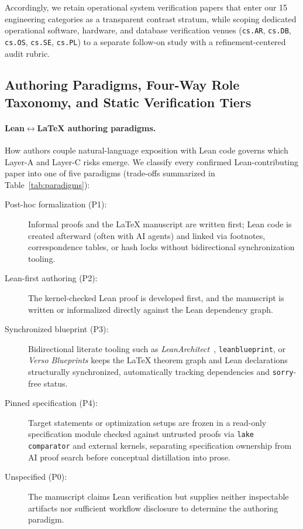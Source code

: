 \documentclass[11pt,letterpaper]{article}
\begin{document}
Accordingly, we retain operational system verification papers that enter our 15 engineering categories as a transparent contrast stratum, while scoping dedicated operational software, hardware, and database verification venues (\texttt{cs.AR}, \texttt{cs.DB}, \texttt{cs.OS}, \texttt{cs.SE}, \texttt{cs.PL}) to a separate follow-on study with a refinement-centered audit rubric.

\subsection{Authoring Paradigms, Four-Way Role Taxonomy, and Static Verification Tiers}
\label{sec:framework}

\paragraph{Lean$\leftrightarrow$\LaTeX{} authoring paradigms.}
How authors couple natural-language exposition with Lean code governs which Layer-A and Layer-C risks emerge. We classify every confirmed Lean-contributing paper into one of five paradigms (trade-offs summarized in Table~\ref{tab:paradigms}):
\begin{description}
  \item[Post-hoc formalization (P1):] Informal proofs and the \LaTeX{} manuscript are written first; Lean code is created afterward (often with AI agents) and linked via footnotes, correspondence tables, or hash locks without bidirectional synchronization tooling.
  \item[Lean-first authoring (P2):] The kernel-checked Lean proof is developed first, and the manuscript is written or informalized directly against the Lean dependency graph.
  \item[Synchronized blueprint (P3):] Bidirectional literate tooling such as \emph{LeanArchitect}~\cite{zhu2026leanarchitect}, \texttt{leanblueprint}, or \emph{Verso Blueprints} keeps the \LaTeX{} theorem graph and Lean declarations structurally synchronized, automatically tracking dependencies and \texttt{sorry}-free status.
  \item[Pinned specification (P4):] Target statements or optimization setups are frozen in a read-only specification module checked against untrusted proofs via \texttt{lake comparator} and external kernels, separating specification ownership from AI proof search before conceptual distillation into prose.
  \item[Unspecified (P0):] The manuscript claims Lean verification but supplies neither inspectable artifacts nor sufficient workflow disclosure to determine the authoring paradigm.
\end{description}
\end{document}
